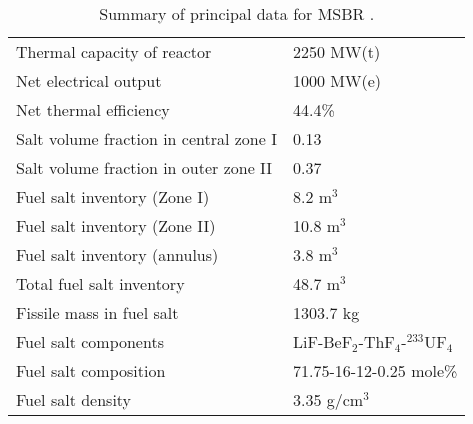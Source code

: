 \begin{table}[h!]
        \caption{Summary of principal data for MSBR \cite{robertson_conceptual_1971}.}
        \begin{tabularx}{\textwidth}{ s  s}
        \hline
                Thermal capacity of reactor           		& 2250 MW(t)
                \\ 
                Net electrical output                 		& 1000 MW(e) 
                \\  
                Net thermal efficiency        				& 44.4\%
                \\  
                Salt volume fraction in central zone I		& 0.13
                \\ 
                Salt volume fraction in outer zone II       & 0.37
                \\ 
                Fuel salt inventory (Zone I)                & 8.2 m$^3$	
                \\ 
                Fuel salt inventory (Zone II)               & 10.8 m$^3$	
                \\ 
                Fuel salt inventory (annulus)               & 3.8 m$^3$	
                \\  
                Total fuel salt inventory                   & 48.7 m$^3$	
                \\ 
                Fissile mass in fuel salt                   & 1303.7 kg	
                \\ 
                Fuel salt components                  & 
                LiF-BeF$_2$-ThF$_4$-$^{233}$UF$_4$	
                \\  
                Fuel salt composition                 & 
                71.75-16-12-0.25 mole\%
                \\
                Fuel salt density                    & 
                3.35 g/cm$^3$
                \\ \hline
        \end{tabularx}
        \label{tab:msbr_tab}
\end{table}

